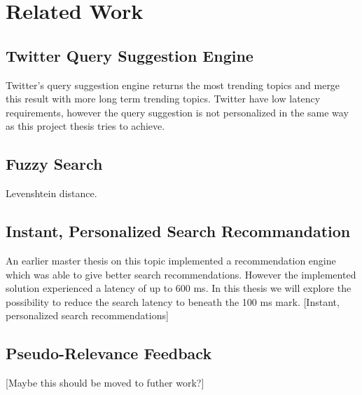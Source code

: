 \chapter{Related Work}

\section{Twitter Query Suggestion Engine}

Twitter’s query suggestion engine \cite{twitter-suggestion} returns the most trending topics and merge this result with more long term trending topics.
Twitter have low latency requirements, however the query suggestion is not personalized in the same way as this project thesis tries to achieve.

\section{Fuzzy Search}
Levenshtein distance.

\section{Instant, Personalized Search Recommandation}
An earlier master thesis on this topic implemented a recommendation engine which was able to give better search recommendations.
However the implemented solution experienced a latency of up to 600 ms.
In this thesis we will explore the possibility to reduce the search latency to beneath the 100 ms mark. [Instant, personalized search recommendations]

\section{Pseudo-Relevance Feedback}
[Maybe this should be moved to futher work?]

